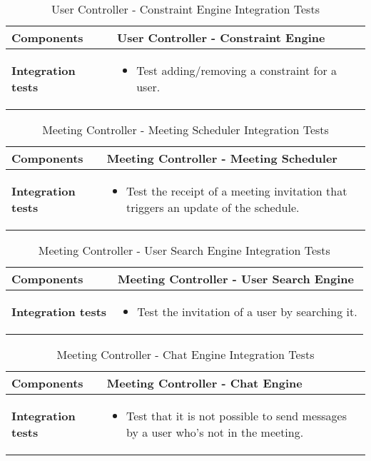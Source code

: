 \begin{table}[H]	
	\centering
	\def\arraystretch{1.5}
	\begin{tabular}{|m{4cm}|m{12cm}|}
		\hline
		\textbf{Components} & User Controller - Constraint Engine \\ \hline
		\textbf{Integration tests} & 
			\begin{itemize}
			\item Test adding/removing a constraint for a user.
			\end{itemize} \\ \hline
	\end{tabular}
	\caption{User Controller - Constraint Engine Integration Tests}
\end{table}

\begin{table}[H]	
	\centering
	\def\arraystretch{1.5}
	\begin{tabular}{|m{4cm}|m{12cm}|}
		\hline
		\textbf{Components} & Meeting Controller - Meeting Scheduler \\ \hline
		\textbf{Integration tests} & 
			\begin{itemize}
			\item Test the receipt of a meeting invitation that triggers an update of the schedule.
			\end{itemize} \\ \hline
	\end{tabular}
	\caption{Meeting Controller - Meeting Scheduler Integration Tests}
\end{table}

\begin{table}[H]	
	\centering
	\def\arraystretch{1.5}
	\begin{tabular}{|m{4cm}|m{12cm}|}
		\hline
		\textbf{Components} & Meeting Controller - User Search Engine \\ \hline
		\textbf{Integration tests} & 
			\begin{itemize}
			\item Test the invitation of a user by searching it.
			\end{itemize} \\ \hline
	\end{tabular}
	\caption{Meeting Controller - User Search Engine Integration Tests}
\end{table}

\begin{table}[H]	
	\centering
	\def\arraystretch{1.5}
	\begin{tabular}{|m{4cm}|m{12cm}|}
		\hline
		\textbf{Components} & Meeting Controller - Chat Engine \\ \hline
		\textbf{Integration tests} & 
			\begin{itemize}
			\item Test that it is not possible to send messages by a user who's not in the meeting.
			\end{itemize} \\ \hline
	\end{tabular}
	\caption{Meeting Controller - Chat Engine Integration Tests}
\end{table}

